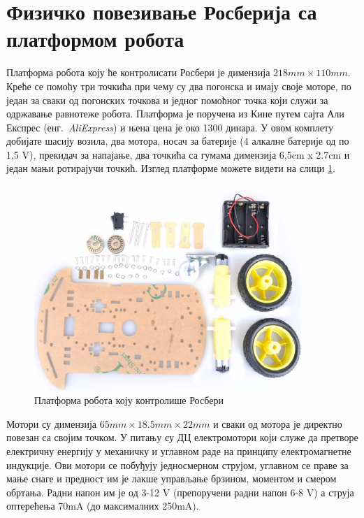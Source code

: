 \documentclass[12pt,oneside]{memoir}
\theoremstyle{remark}
\begin{document}
\section{Физичко повезивање Росберија са платформом робота}
Платформа робота коју ће контролисати Росбери је димензија $218mm \times 110mm$. Креће се помоћу три точкића при чему су два погонска и имају своје моторе, по један за сваки од погонских точкова и једног помоћног точка који служи за одржавање равнотеже робота. Платформа је поручена из Кине путем сајта Али Експрес (енг.~{\em AliExpress}) и њена цена је око 1300 динара. У овом комплету добијате шасију возила, два мотора, носач за батерије (4 алкалне батерије од по 1,5 V), прекидач за напајање, два точкића са гумама димензија 6,5cm x 2.7cm и један мањи ротирајучи точкић. Изглед платформе можете видети на слици \ref{fig:platformarobota}. 

\begin{figure}[!ht]
\centering
\includegraphics[width=0.9\textwidth]{slike/platforma.png}
\caption{Платформа робота коју контролише Росбери}
\label{fig:platformarobota}
\end{figure}

Мотори су димензија $65mm \times 18.5mm \times 22mm$ и сваки од мотора је директно повезан са својим точком. У питању су ДЦ електромотори који служе да претворе електричну енергију у механичку и углавном раде на принципу електромагнетне индукције. Ови мотори се побуђују једносмерном струјом, углавном се праве за мање снаге и предност им је лакше управљање брзином, моментом и смером обртања. Радни напон им је од 3-12 V (препоручени радни напон 6-8 V) а струја оптерећења 70mA (до максималних 250mA).
\end{document}
